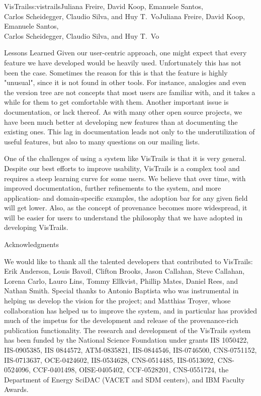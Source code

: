 \begin{aosachaptertoc}{VisTrails}{s:vistrails}{Juliana Freire, David Koop, Emanuele Santos, \\ Carlos Scheidegger, Claudio Silva, and Huy T.\ Vo}{Juliana Freire, David Koop, Emanuele Santos, \\ \hspace*{0.9cm} Carlos Scheidegger, Claudio Silva, and Huy T.\ Vo}
\begin{aosasect1}{Lessons Learned}
Given our user-centric approach, one might expect that every feature
we have developed would be heavily used. Unfortunately this has not
been the case.  Sometimes the reason for this is that the feature is
highly "unusual", since it is not found in other tools. For instance,
analogies and even the version tree are not concepts that most users
are familiar with, and it takes a while for them to get comfortable
with them. Another important issue is documentation, or lack
thereof. As with many other open source projects, we have been much
better at developing new features than at documenting the existing
ones. This lag in documentation leads not only to the underutilization
of useful features, but also to many questions on our mailing lists.

One of the challenges of using a system like VisTrails is that it is
very general. Despite our best efforts to improve usability, VisTrails
is a complex tool and requires a steep learning curve for some
users. We believe that over time, with improved documentation, further
refinements to the system, and more application- and domain-specific
examples, the adoption bar for any given field will get lower. Also,
as the concept of provenance becomes more widespread, it will be
easier for users to understand the philosophy that we have adopted in
developing VisTrails.

\begin{aosasect2}{Acknowledgments}

We would like to thank all the talented developers that contributed to
VisTrails: Erik Anderson, Louis Bavoil, Clifton Brooks, Jason
Callahan, Steve Callahan, Lorena Carlo, Lauro Lins, Tommy Ellkvist,
Phillip Mates, Daniel Rees, and Nathan Smith. Special thanks to
Antonio Baptista who was instrumental in helping us develop the vision
for the project; and Matthias Troyer, whose collaboration has helped
us to improve the system, and in particular has provided much of the
impetus for the development and release of the provenance-rich
publication functionality. The research and development of the
VisTrails system has been funded by the National Science Foundation under grants IIS 1050422, IIS-0905385, IIS 0844572, ATM-0835821,
IIS-0844546, IIS-0746500, CNS-0751152, IIS-0713637, OCE-0424602,
IIS-0534628, CNS-0514485, IIS-0513692, CNS-0524096, CCF-0401498,
OISE-0405402, CCF-0528201, CNS-0551724,
the Department of Energy SciDAC (VACET and SDM centers), and IBM Faculty Awards.

\end{aosasect2}

\end{aosasect1}

\end{aosachaptertoc}
